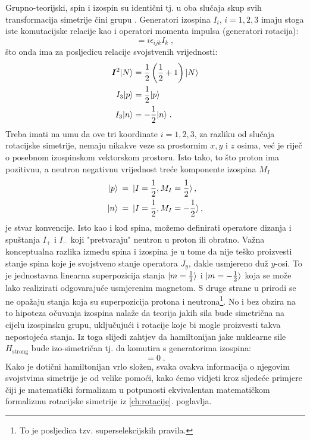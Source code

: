 Grupno-teorijski, spin i izospin su identični tj. u oba
slučaja skup svih transformacija simetrije čini grupu .
Generatori izospina $I_i$, $i=1,2,3$ imaju stoga iste komutacijske relacije
kao i operatori momenta impulsa (generatori rotacija):
\begin{equation}
  [I_i, I_j] = i \epsilon_{ijk} I_k  \;,
\end{equation}
što onda ima za posljedicu relacije svojstvenih vrijednosti:
\begin{align}
\vec{I}^2 \ket{N} &= \fhalf \left(\fhalf +1\right)  \ket{N} \\
I_3 \ket{p} &= \fhalf  \ket{p} \\
I_3 \ket{n} &= - \fhalf  \ket{n} \;.
\end{align}
Treba imati na umu da ove tri koordinate $i=1,2,3$, za razliku od
slučaja rotacijske simetrije, nemaju nikakve veze sa prostornim
$x, y$ i $z$ osima, već je riječ o posebnom izospinskom vektorskom prostoru.
Isto tako, to što proton ima pozitivnu, a neutron negativnu vrijednost
treće komponente izospina $M_I$
\begin{align}
   | p \rangle & \:=\: | I=\frac{1}{2}, M_I=\frac{1}{2} \rangle \,, \\
   | n \rangle & \:=\: | I=\frac{1}{2},M_I=-\frac{1}{2} \rangle \,,
\end{align}
je stvar konvencije.
Isto kao i kod spina, možemo definirati operatore dizanja i
spuštanja $I_+$ i $I_-$ koji "pretvaraju" neutron u proton
ili obratno. Važna konceptualna razlika između spina i izospina 
je u tome da nije teško proizvesti stanje spina koje je svojstveno
stanje operatora $J_y$, dakle usmjereno duž $y$-osi. To je jednostavna
linearna superpozicija stanja $| m=\frac{1}{2} \rangle$ i $| m=-\frac{1}{2} \rangle$ koja
se može lako realizirati odgovarajuće usmjerenim magnetom.
S druge strane u prirodi se ne opažaju stanja koja su superpozicija
protona i neutrona\footnote{To je posljedica tzv. superselekcijskih  pravila.}.
No i bez obzira na to hipoteza očuvanja izospina
nalaže da teorija jakih sila bude simetrična na cijelu izospinsku grupu,
uključujući i rotacije koje bi mogle proizvesti takva nepostojeća stanja.
Iz toga slijedi zahtjev da hamiltonijan
jake nuklearne sile $H_{\text{strong}}$ bude izo-simetričan tj. da komutira
s generatorima izospina:
\begin{equation}
   [H_{\text{strong}}, I_i] = 0 \;.
   \label{eq:HstrongI0}
\end{equation}
Kako je dotični hamiltonijan vrlo složen, svaka
ovakva informacija o njegovim svojstvima simetrije je od velike
pomoći, kako ćemo vidjeti kroz sljedeće primjere čiji je matematički
formalizam u potpunosti ekvivalentan matematičkom formalizmu
rotacijske simetrije iz \ref{ch:rotacije}. poglavlja.

